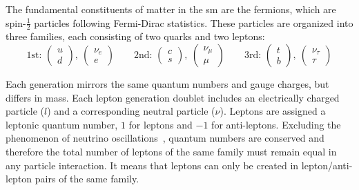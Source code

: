 The fundamental constituents of matter in the \acrshort{sm} are the fermions, which are spin-$\frac{1}{2}$ particles following Fermi-Dirac statistics. These particles are organized into three families, each consisting of two quarks and two leptons: 
\begin{equation}
\text{1st: } \left( \begin{matrix} u \\ d \end{matrix} \right),\ \left( \begin{matrix} \nu_e \\ e \end{matrix} \right) \qquad
\text{2nd: } \left( \begin{matrix} c \\ s \end{matrix} \right),\ \left( \begin{matrix} \nu_\mu \\ \mu \end{matrix} \right) \qquad
\text{3rd: } \left( \begin{matrix} t \\ b \end{matrix} \right),\ \left( \begin{matrix} \nu_\tau \\ \tau \end{matrix} \right)
\end{equation}

Each generation mirrors the same quantum numbers and gauge charges, but differs in mass. Each lepton generation doublet includes an electrically charged particle ($l$) and a corresponding neutral particle ($\nu$). Leptons are assigned a leptonic quantum number, $1$ for leptons and $-1$ for anti-leptons. Excluding the phenomenon of neutrino oscillations~\cite{neutrino1,neutrino2}, quantum numbers are conserved and therefore the total number of leptons of the same family must remain equal in any particle interaction. It means that leptons can only be created in lepton/anti-lepton pairs of the same family. 

